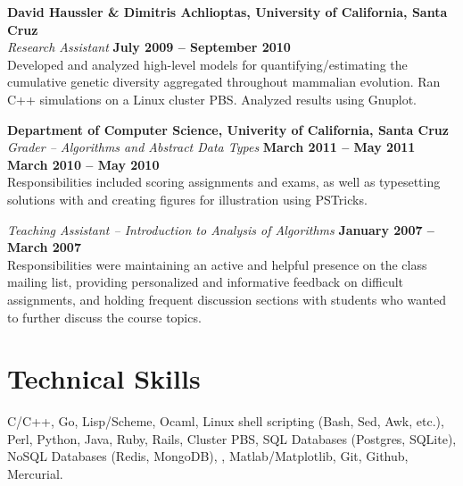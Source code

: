 \documentclass[margin,line]{resume}
\begin{document}
\begin{resume}
    \textbf{David Haussler \& Dimitris Achlioptas, University of California, Santa Cruz} \vspace{2mm}\\\vspace{1mm}%
    \textsl{Research Assistant} \hfill \textbf{July 2009 -- September 2010}\\
    Developed and analyzed high-level models for quantifying/estimating
    the cumulative genetic diversity aggregated throughout mammalian
    evolution. Ran C++ simulations on a Linux cluster PBS. Analyzed
    results using Gnuplot.

    \textbf{Department of Computer Science, Univerity of California, Santa Cruz} \vspace{2mm}\\\vspace{1mm}%
    \textsl{Grader -- Algorithms and Abstract Data Types} \hfill \textbf{March 2011 -- May 2011}\\
    \vspace{0mm}    \hfill \textbf{March 2010 -- May 2010}\\
    Responsibilities included scoring assignments and exams, as well as
    typesetting solutions with \LaTeXe and creating figures for illustration
    using PSTricks.

    \textsl{Teaching Assistant -- Introduction to Analysis of Algorithms} \hfill \textbf{January 2007 -- March 2007}\\
    Responsibilities were maintaining an active and helpful presence
    on the class mailing list, providing personalized and informative
    feedback on difficult assignments, and holding frequent discussion
    sections with students who wanted to further discuss the course
    topics.

    \section{\mysidestyle Technical Skills} 

    C/C++, Go, Lisp/Scheme, Ocaml,
    Linux shell scripting (Bash, Sed, Awk, etc.),
    Perl, Python, Java, Ruby, Rails, Cluster PBS,
    SQL Databases (Postgres, SQLite),
    NoSQL Databases (Redis, MongoDB),
    \LaTeXe, Matlab/Matplotlib, Git, Github,
    Mercurial.


\end{resume}
\end{document}

